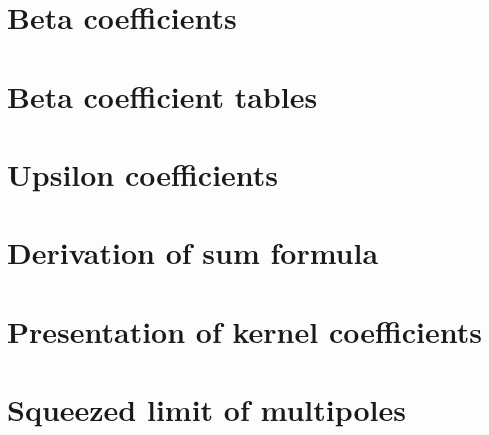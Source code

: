 \begin{appendices}
%
\chapter{Beta coefficients}
\label{app_betas}
%

%
\chapter{Beta coefficient tables}
\label{app_pnga}
%

%
\chapter{Upsilon coefficients}
\label{app_pngb}
%

%
\chapter{Derivation of sum formula}
\label{app_sum}
%

%
\chapter{Presentation of kernel coefficients}
\label{app_kernelpres}
%

%
\chapter{Squeezed limit of multipoles}
\label{app_sqlimmultip}
%


\end{appendices}
